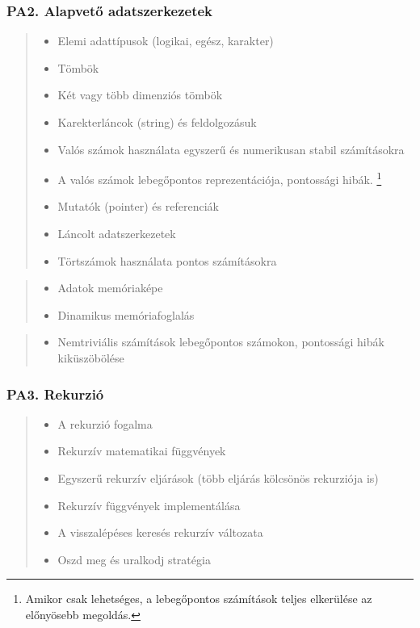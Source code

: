 \documentclass[a4paper,11pt,oneside]{article}
\newcommand{\cmark}{\ding{51}}%
\newcommand{\xmark}{\ding{55}}%
\newcommand{\CC}[1]{#1}
\newcommand{\Cincluded}{{\small\cmark}}
\newcommand{\Ccodeonly}{{\small\cmark\faFileText}}
\newcommand{\Cnofocus}{{\small\faQuestion}}
\newcommand{\Cexmaybe}{{\small\xmark\faQuestionCircle}}
\newcommand{\Cexcluded}{{\small\xmark}}
\newcommand{\Iincluded}{\item[\hbox to 1.8em{\Cincluded\hfill}]}
\newcommand{\Icodeonly}{\item[\hbox to 1.8em{\Ccodeonly\hfill}]}
\newcommand{\Inofocus}{\item[\hbox to 1.8em{\Cnofocus\hfill}]}
\newcommand{\Iexmaybe}{\item[\hbox to 1.8em{\Cexmaybe\hfill}]}
\newcommand{\Iexcluded}{\item[\hbox to 1.8em{\Cexcluded\hfill}]}
\newenvironment{myitemize}{\begin{quote}\begin{itemize}\itemsep 0pt}{\end{itemize}\end{quote}}
\begin{document}
    \subsubsection*{PA2. Alapvető adatszerkezetek} %

    \begin{myitemize}
    \Iincluded\CC{Elemi adattípusok} (logikai, egész, karakter) %
    \Iincluded\CC{Tömbök}  %
    \Iincluded\CC{Két vagy több dimenziós tömbök}
    \Iincluded\CC{Karekterláncok (string) és feldolgozásuk} %
    \Icodeonly\CC{Valós számok használata egyszerű és numerikusan stabil számításokra} %
    \Icodeonly A valós számok lebegőpontos reprezentációja, pontossági hibák. \footnote{Amikor csak lehetséges, a lebegőpontos számítások teljes elkerülése az előnyösebb megoldás.}
    \Icodeonly\CC{Mutatók (pointer) és referenciák}
    \Iexmaybe \CC{Láncolt adatszerkezetek} %
    \Iexmaybe Törtszámok használata pontos számításokra %
    
    \end{myitemize}

    \begin{myitemize}
    \Inofocus \CC{Adatok memóriaképe} %
    \Inofocus \CC{Dinamikus memóriafoglalás} %
    \end{myitemize}
    
    \begin{myitemize}
    \Iexcluded Nemtriviális számítások lebegőpontos számokon, pontossági hibák kiküszöbölése %
    \end{myitemize}

    \subsubsection*{PA3. Rekurzió} %

    \begin{myitemize}
    \Iincluded\CC{A rekurzió fogalma} %
    \Iincluded\CC{Rekurzív matematikai függvények} %
    \Iincluded\CC{Egyszerű rekurzív eljárások} (több eljárás kölcsönös rekurziója is) %
    \Icodeonly\CC{Rekurzív függvények implementálása} %
    \Icodeonly\CC{A visszalépéses keresés rekurzív változata} %
    \Iexmaybe \CC{Oszd meg és uralkodj stratégia} %
    \end{myitemize}
\end{document}
